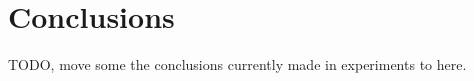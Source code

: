 \chapter{Conclusions}\label{chapter:conclusions}

TODO, move some the conclusions currently made in experiments to here.
